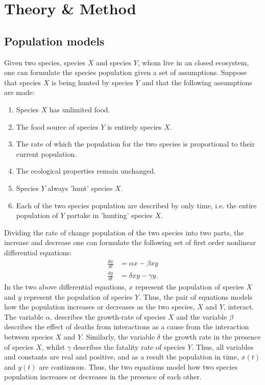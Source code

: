 \documentclass[a4paper]{article}
\begin{document}
\tableofcontents
\newpage
\section{Theory \& Method}
\subsection{Population models}
Given two species, species $X$ and species $Y$, whom live in an closed ecosystem, one can formulate the species population given a set of assumptions. Suppose that species $X$ is being hunted by species $Y$ and that the following assumptions are made:
\begin{enumerate}
    \item Species $X$ has unlimited food.
    \item The food source of species $Y$ is entirely species $X$.
    \item The rate of which the population for the two species is proportional to their current population.
    \item The ecological properties remain unchanged.
    \item Species $Y$ always 'hunt' species $X$.
    \item Each of the two species population are described by only time, i.e. the entire population of $Y$ partake in 'hunting' species $X$.
\end{enumerate}Dividing the rate of change population of the two species into two parts, the increase and decrease one can formulate the following set of first order nonlinear differential equations:
\begin{align}
    \frac{dx}{dt} &= \alpha x - \beta xy \nonumber\\
    \frac{dy}{dt} &= \delta xy - \gamma y.\label{eq: Lotka-Voltera equations}
\end{align}In the two above differential equations, $x$ represent the population of species $X$ and $y$ represent the population of species $Y$. Thus, the pair of equations models how the population increases or decreases as the two species, $X$ and $Y$, interact.
The variable $\alpha$, describes the growth-rate of species $X$ and the variable $\beta$ describes the effect of deaths from interactions as a cause from the interaction between species $X$ and $Y$. Similarly, the variable $\delta$ the growth rate in the presence of species $X$, whilst $\gamma$ describes the fatality rate of species $Y$. Thus, all variables and constants are real and positive, and as a result the population in time, $x(t)$ and $y(t)$ are continuous. Thus, the two equations model how two species population increases or decreases in the presence of each other.
\end{document}
